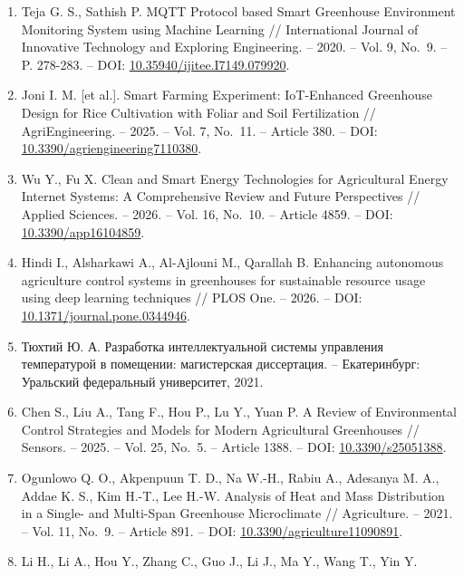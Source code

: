 \documentclass[a4paper,14pt]{extarticle}
\begin{document}
\begin{enumerate}
  the artificial bee colony algorithm // Scientific Reports. -- 2025. --
  Vol. 15. -- DOI:
  \href{https://doi.org/10.1038/s41598-024-84141-5}{10.1038/s41598-024-84141-5}.
\item
  Teja G. S., Sathish P. MQTT Protocol based Smart Greenhouse
  Environment Monitoring System using Machine Learning // International
  Journal of Innovative Technology and Exploring Engineering. -- 2020.
  -- Vol. 9, No.~9. -- P. 278-283. -- DOI:
  \href{https://doi.org/10.35940/ijitee.I7149.079920}{10.35940/ijitee.I7149.079920}.
\item
  Joni I. M. {[}et al.{]}. Smart Farming Experiment: IoT-Enhanced
  Greenhouse Design for Rice Cultivation with Foliar and Soil
  Fertilization // AgriEngineering. -- 2025. -- Vol. 7, No.~11. --
  Article 380. -- DOI:
  \href{https://doi.org/10.3390/agriengineering7110380}{10.3390/agriengineering7110380}.
\item
  Wu Y., Fu X. Clean and Smart Energy Technologies for Agricultural
  Energy Internet Systems: A Comprehensive Review and Future
  Perspectives // Applied Sciences. -- 2026. -- Vol. 16, No.~10. --
  Article 4859. -- DOI:
  \href{https://doi.org/10.3390/app16104859}{10.3390/app16104859}.
\item
  Hindi I., Alsharkawi A., Al-Ajlouni M., Qarallah B. Enhancing
  autonomous agriculture control systems in greenhouses for sustainable
  resource usage using deep learning techniques // PLOS One. -- 2026. --
  DOI:
  \href{https://doi.org/10.1371/journal.pone.0344946}{10.1371/journal.pone.0344946}.
\item
  Тюхтий Ю. А. Разработка интеллектуальной системы управления
  температурой в помещении: магистерская диссертация. -- Екатеринбург:
  Уральский федеральный университет, 2021.
\item
  Chen S., Liu A., Tang F., Hou P., Lu Y., Yuan P. A Review of
  Environmental Control Strategies and Models for Modern Agricultural
  Greenhouses // Sensors. -- 2025. -- Vol. 25, No.~5. -- Article 1388.
  -- DOI: \href{https://doi.org/10.3390/s25051388}{10.3390/s25051388}.
\item
  Ogunlowo Q. O., Akpenpuun T. D., Na W.-H., Rabiu A., Adesanya M. A.,
  Addae K. S., Kim H.-T., Lee H.-W. Analysis of Heat and Mass
  Distribution in a Single- and Multi-Span Greenhouse Microclimate //
  Agriculture. -- 2021. -- Vol. 11, No.~9. -- Article 891. -- DOI:
  \href{https://doi.org/10.3390/agriculture11090891}{10.3390/agriculture11090891}.
\item
  Li H., Li A., Hou Y., Zhang C., Guo J., Li J., Ma Y., Wang T., Yin Y.

\end{enumerate}
\end{document}
